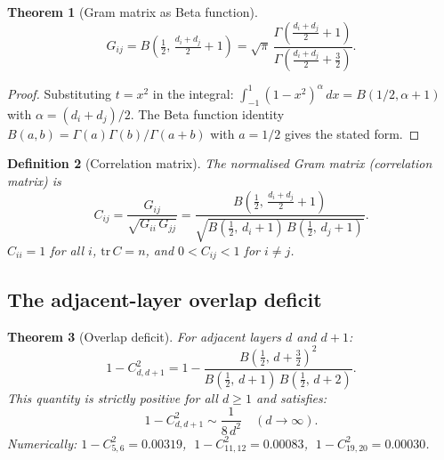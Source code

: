 \documentclass[12pt,a4paper]{article}
\newtheorem{theorem}{Theorem}[section]
\newtheorem{definition}[theorem]{Definition}
\theoremstyle{remark}
\begin{document}
\begin{theorem}[Gram matrix as Beta function]\label{thm:gram}
\[
G_{ij} = B\!\left(\tfrac{1}{2},\, \tfrac{d_i + d_j}{2} + 1\right) = \sqrt{\pi}\, \frac{\Gamma\!\left(\frac{d_i + d_j}{2} + 1\right)}{\Gamma\!\left(\frac{d_i + d_j}{2} + \frac{3}{2}\right)}.
\]
\end{theorem}

\begin{proof}
Substituting $t = x^2$ in the integral: $\int_{-1}^{1}(1 - x^2)^\alpha\, dx = B(1/2, \alpha + 1)$ with $\alpha = (d_i + d_j)/2$. The Beta function identity $B(a,b) = \Gamma(a)\Gamma(b)/\Gamma(a+b)$ with $a = 1/2$ gives the stated form.
\end{proof}

\begin{definition}[Correlation matrix]
The normalised Gram matrix (correlation matrix) is
\[
C_{ij} = \frac{G_{ij}}{\sqrt{G_{ii}\, G_{jj}}} = \frac{B\!\left(\frac{1}{2},\, \frac{d_i + d_j}{2} + 1\right)}{\sqrt{B\!\left(\frac{1}{2},\, d_i + 1\right)\, B\!\left(\frac{1}{2},\, d_j + 1\right)}}.
\]
$C_{ii} = 1$ for all $i$, $\mathrm{tr}\, C = n$, and $0 < C_{ij} < 1$ for $i \neq j$.
\end{definition}

\subsection{The adjacent-layer overlap deficit}

\begin{theorem}[Overlap deficit]\label{thm:overlap}
For adjacent layers $d$ and $d+1$:
\[
1 - C_{d,d+1}^2 = 1 - \frac{B\!\left(\frac{1}{2},\, d + \frac{3}{2}\right)^2}{B\!\left(\frac{1}{2},\, d+1\right)\, B\!\left(\frac{1}{2},\, d+2\right)}.
\]
This quantity is strictly positive for all $d \geq 1$ and satisfies:
\[
1 - C_{d,d+1}^2 \sim \frac{1}{8\, d^2} \quad (d \to \infty).
\]
Numerically: $1 - C_{5,6}^2 = 0.00319$, $\; 1 - C_{11,12}^2 = 0.00083$, $\; 1 - C_{19,20}^2 = 0.00030$.
\end{theorem}
\end{document}
